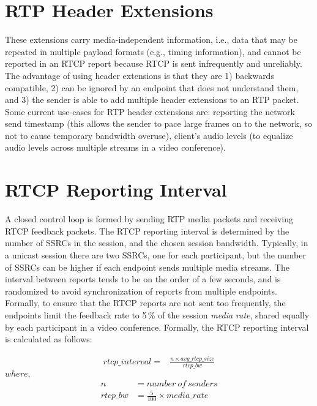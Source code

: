 \section{RTP Header Extensions}

These extensions carry media-independent information, i.e., data that may be
repeated in multiple payload formats (e.g., timing information), and cannot be
reported in an RTCP report because RTCP is sent infrequently and unreliably.
The advantage of using header extensions is that they are 1) backwards
compatible, 2) can be ignored by an endpoint that does not understand them,
and 3) the sender is able to add multiple header extensions to an RTP packet.
Some current use-cases for RTP header extensions are: reporting the network
send timestamp (this allows the sender to pace large frames on to the network,
so not to cause temporary bandwidth overuse), client's audio levels (to
equalize audio levels across multiple streams in a video conference).

\section{RTCP Reporting Interval}

A closed control loop is formed by sending RTP media packets and receiving
RTCP feedback packets. The RTCP reporting interval is determined by the number
of SSRCs in the session, and the chosen session bandwidth. Typically, in a
unicast session there are two SSRCs, one for each participant, but the number
of SSRCs can be higher if each endpoint sends multiple media streams. The
interval between reports tends to be on the order of a few seconds, and is
randomized to avoid synchronization of reports from multiple endpoints.
Formally, to ensure that the RTCP reports are not sent too frequently, the
endpoints limit the feedback rate to 5\,\% of the session \textit{media rate},
shared equally by each participant in a video conference. Formally, the RTCP
reporting interval is calculated as follows:

\begin{align}
rtcp\_interval = & \frac{n \times avg\_rtcp\_size}{rtcp\_bw}
\label{eq:rtcp.int}
\end{align}
\hspace{35mm}$where,$
\begin{align*}
n &=  number\ of\ senders \\
rtcp\_bw &=  \frac{5}{100} \times media\_rate
\end{align*}


